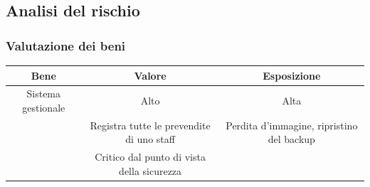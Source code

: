\documentclass[a4paper]{article}
\begin{document}
\newpage

\subsection{Analisi del rischio}

\subsubsection{Valutazione dei beni}

\begin{center}
    \begin{tabulary}{1\textwidth}{c|C|C}
         \textbf{Bene} & \textbf{Valore} & \textbf{Esposizione}  \\
         \hline
         \hline
         Sistema gestionale & Alto & Alta \\
                            & Registra tutte le prevendite di uno staff & Perdita d'immagine, ripristino del backup \\
                            & Critico dal punto di vista della sicurezza &  \\
    \end{tabulary}
\end{center}
\end{document}
